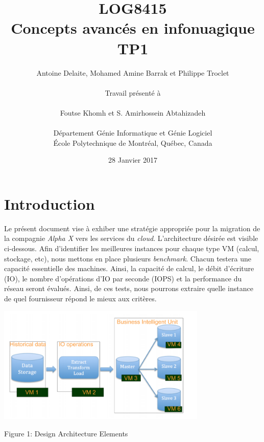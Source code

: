 \documentclass[11pt]{article}
\title{LOG8415 \\ Concepts avanc\'{e}s en infonuagique \\ TP1}
\author{
	Antoine Delaite, Mohamed Amine Barrak et Philippe Troclet \\
		\\
	Travail pr\'{e}sent\'{e} \`a \\
		\\
	Foutse Khomh et S. Amirhossein Abtahizadeh \\
		\\
	D\'{e}partement G\'{e}nie Informatique et G\'{e}nie Logiciel \\
	\'{E}cole Polytechnique de Montr\'{e}al, Qu\'{e}bec, Canada
}
\date{28 Janvier 2017}
\begin{document}
\maketitle

\section{Introduction}

Le présent document vise à exhiber une stratégie appropriée pour la migration de la compagnie \textit{Alpha X} vers les services du \textit{cloud}. L'architecture désirée est visible ci-dessous. Afin d'identifier les meilleures instances pour chaque type VM (calcul, stockage, etc), nous mettons en place plusieurs \textit{benchmark}. Chacun testera une capacité essentielle des machines. Ainsi, la capacité de calcul, le débit d'écriture (IO), le nombre d'opérations d'IO par seconde (IOPS) et la performance du réseau seront évalués. Ainsi, de ces tests, nous pourrons extraire quelle instance de quel fournisseur répond le mieux aux critères.
~\\
\centerline{\includegraphics[width=0.75\textwidth]{images/design_architechture_element}} %
\centerline{Figure 1: Design Architecture Elements} 
~\\
\end{document}
